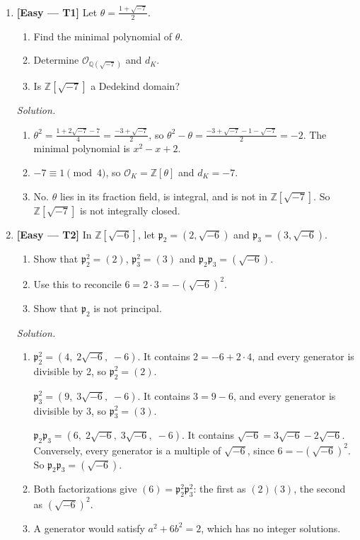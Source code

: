 \documentclass[11pt]{article}
\newcommand{\Z}{\mathbb{Z}}
\newcommand{\Q}{\mathbb{Q}}
\newcommand{\OK}{\mathcal{O}_K}
\newcommand{\cO}{\mathcal{O}}
\newcommand{\fp}{\mathfrak{p}}
\begin{document}
\begin{enumerate}[label=\textbf{B\arabic*.}]
  \item \textbf{[Easy --- T1]} Let $\theta=\frac{1+\sqrt{-7}}2$.
  \begin{enumerate}[label=(\alph*)]
    \item Find the minimal polynomial of $\theta$.
    \item Determine $\cO_{\Q(\sqrt{-7})}$ and $d_K$.
    \item Is $\Z[\sqrt{-7}]$ a Dedekind domain?
  \end{enumerate}

  \textit{Solution.}
  \begin{enumerate}[label=(\alph*)]
    \item $\theta^2=\frac{1+2\sqrt{-7}-7}{4}=\frac{-3+\sqrt{-7}}2$, so $\theta^2-\theta=\frac{-3+\sqrt{-7}-1-\sqrt{-7}}{2}=-2$. The minimal polynomial is $x^2-x+2$.
    \item $-7\equiv1\pmod 4$, so $\OK=\Z[\theta]$ and $d_K=-7$.
    \item No. $\theta$ lies in its fraction field, is integral, and is not in $\Z[\sqrt{-7}]$. So $\Z[\sqrt{-7}]$ is not integrally closed.
  \end{enumerate}

  \item \textbf{[Easy --- T2]} In $\Z[\sqrt{-6}]$, let $\fp_2=(2,\sqrt{-6})$ and $\fp_3=(3,\sqrt{-6})$.
  \begin{enumerate}[label=(\alph*)]
    \item Show that $\fp_2^2=(2)$, $\fp_3^2=(3)$ and $\fp_2\fp_3=(\sqrt{-6})$.
    \item Use this to reconcile $6=2\cdot3=-(\sqrt{-6})^2$.
    \item Show that $\fp_2$ is not principal.
  \end{enumerate}

  \textit{Solution.}
  \begin{enumerate}[label=(\alph*)]
    \item $\fp_2^2=(4,\;2\sqrt{-6},\;-6)$. It contains $2=-6+2\cdot4$, and every generator is divisible by 2, so $\fp_2^2=(2)$.

    $\fp_3^2=(9,\;3\sqrt{-6},\;-6)$. It contains $3=9-6$, and every generator is divisible by 3, so $\fp_3^2=(3)$.

    $\fp_2\fp_3=(6,\;2\sqrt{-6},\;3\sqrt{-6},\;-6)$. It contains $\sqrt{-6}=3\sqrt{-6}-2\sqrt{-6}$. Conversely, every generator is a multiple of $\sqrt{-6}$, since $6=-(\sqrt{-6})^2$. So $\fp_2\fp_3=(\sqrt{-6})$.
    \item Both factorizations give $(6)=\fp_2^2\fp_3^2$: the first as $(2)(3)$, the second as $(\sqrt{-6})^2$.
    \item A generator would satisfy $a^2+6b^2=2$, which has no integer solutions.
  \end{enumerate}


\end{enumerate}
\end{document}
